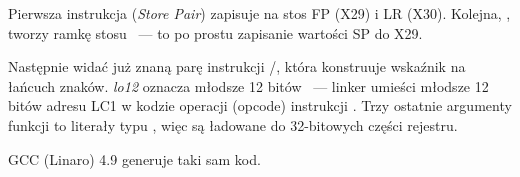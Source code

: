 


Pierwsza instrukcja  (\emph{Store Pair}) zapisuje na stos \ac{FP} (X29) i \ac{LR} (X30).
Kolejna, , tworzy ramkę stosu ~--- to po prostu zapisanie wartości \ac{SP} do X29.

Następnie widać już znaną parę instrukcji /\ADD, która konstruuje wskaźnik na łańcuch znaków.
\emph{lo12} oznacza młodsze 12 bitów ~--- linker umieści młodsze 12 bitów adresu LC1 w kodzie operacji (opcode) instrukcji \ADD. Trzy ostatnie argumenty funkcji \printf to literały typu \Tint, więc są ładowane do 32-bitowych części rejestru.

\Optimizing GCC (Linaro) 4.9 generuje taki sam kod.

